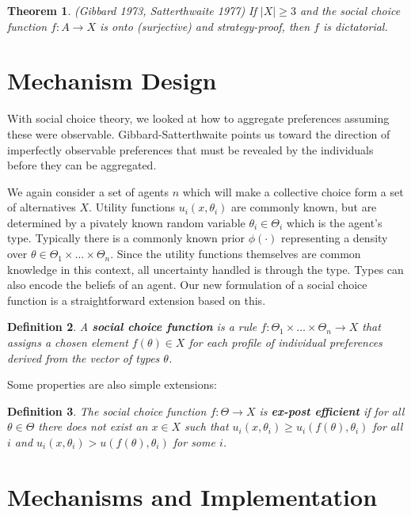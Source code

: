 \documentclass[letter, 10pt]{article}
\newtheorem{theorem}{Theorem}[section]
\newtheorem{definition}[theorem]{Definition}
\theoremstyle{definition}
\begin{document}
\begin{spacing}{1.1}
\begin{theorem}
  (Gibbard 1973, Satterthwaite 1977) If  $|X| \geq 3$ and
  the social choice function $f: A \to X$ is onto (surjective) and
  strategy-proof, then $f$ is dictatorial.
\end{theorem}

\section{Mechanism Design}

With social choice theory, we looked at how to aggregate preferences
assuming these were observable. Gibbard-Satterthwaite points us toward the
direction of imperfectly observable preferences that must be revealed by
the individuals before they can be aggregated.

We again consider a set of agents $n$ which will make a collective choice
form a set of alternatives $X$. Utility functions $u_i(x, \theta_i)$ are
commonly known, but are determined by a pivately known random variable
$\theta_i \in \Theta_i$ which is the agent's type. Typically there is a
commonly known prior $\phi(\cdot)$ representing a density over $\theta \in
\Theta_1 \times \ldots \times \Theta_n$. Since the utility functions
themselves are common knowledge in this context, all uncertainty handled is
through the type. Types can also encode the beliefs of an agent. Our new
formulation of a social choice function is a straightforward extension
based on this.

\begin{definition}
  A \textbf{social choice function} is a rule $f:
  \Theta_1 \times \ldots \times \Theta_n \to X$ that
  assigns a chosen element $f(\theta) \in X$ for each
  profile of individual preferences derived from the
  vector of types $\theta$.
\end{definition}

Some properties are also simple extensions:

\begin{definition}
  The social choice function $f: \Theta \to X$ is
  \textbf{ex-post efficient} if for all $\theta \in
  \Theta$ there does not exist an $x \in X$ such that
  $u_i(x, \theta_i) \geq u_i(f(\theta), \theta_i)$ for
  all $i$ and $u_i(x, \theta_i) > u(f(\theta), \theta_i)$
  for some $i$.
\end{definition}

\section{Mechanisms and Implementation}


\end{spacing}
\end{document}
